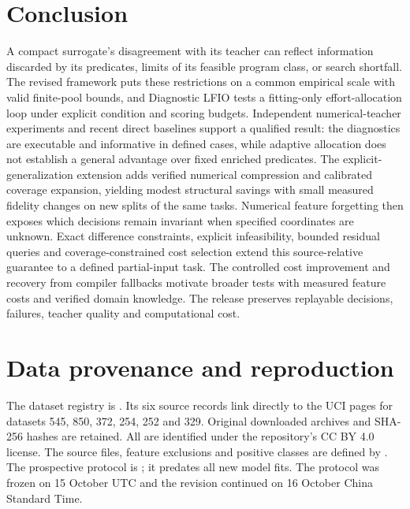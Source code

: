 \documentclass[review,12pt]{elsarticle}
\begin{document}
\section{Conclusion}
A compact surrogate's disagreement with its teacher can reflect information discarded by its predicates, limits of its feasible program class, or search shortfall. The revised framework puts these restrictions on a common empirical scale with valid finite-pool bounds, and Diagnostic LFIO tests a fitting-only effort-allocation loop under explicit condition and scoring budgets. Independent numerical-teacher experiments and recent direct baselines support a qualified result: the diagnostics are executable and informative in defined cases, while adaptive allocation does not establish a general advantage over fixed enriched predicates. The explicit-generalization extension adds verified numerical compression and calibrated coverage expansion, yielding modest structural savings with small measured fidelity changes on new splits of the same tasks. Numerical feature forgetting then exposes which decisions remain invariant when specified coordinates are unknown. Exact difference constraints, explicit infeasibility, bounded residual queries and coverage-constrained cost selection extend this source-relative guarantee to a defined partial-input task. The controlled cost improvement and recovery from compiler fallbacks motivate broader tests with measured feature costs and verified domain knowledge. The release preserves replayable decisions, failures, teacher quality and computational cost.

\appendix
\section{Data provenance and reproduction}\label{app:extension}
The dataset registry is . Its six source records link directly to the UCI pages for datasets 545, 850, 372, 254, 252 and 329. Original downloaded archives and SHA-256 hashes are retained. All are identified under the repository's CC BY 4.0 license. The source files, feature exclusions and positive classes are defined by . The prospective protocol is ; it predates all new model fits. The protocol was frozen on 15 October UTC and the revision continued on 16 October China Standard Time.
\end{document}
